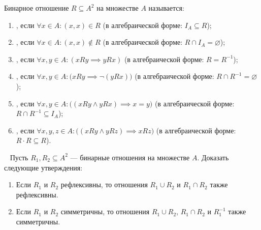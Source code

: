 \begin{definition}
    Бинарное отношение $R \subseteq A^2$ на множестве $A$ называется:
    \begin{enumerate}
        \item {}, если $\forall x \in A : (x, x) \in R$ 
        (в алгебраической форме: $I_A \subseteq R$);
        \item {}, если 
        $\forall x \in A : (x, x) \notin R$ 
        (в алгебраической форме: $R \cap I_A = \varnothing$);
        \item {}, если 
        $\forall x, y \in A : (x R y \implies y R x)$ 
        (в алгебраической форме: $R = R^{-1}$);
        \item {}, если 
        $\forall x, y \in A : \bigl(x R y \implies \neg(y R x)\bigr)$ 
        (в алгебраической форме: $R \cap R^{-1} = \varnothing$);
        \item {}, если 
        $\forall x, y \in A : \bigl((x R y \land y R x) \implies x = y\bigr)$ 
        (в алгебраической форме: $R \cap R^{-1} \subseteq I_A$);
        \item {}, если 
        $\forall x, y, z \in A : \bigl((x R y \land y R z) \implies x R z\bigr)$ 
        (в алгебраической форме: $R \cdot R \subseteq R$).
    \end{enumerate}
\end{definition}

\begin{problem} ~
    Пусть $R_1, R_2 \subseteq A^2$ --- бинарные отношения на множестве $A$. 
    Доказать следующие утверждения:
    \begin{enumerate}
        \item Если $R_1$ и $R_2$ рефлексивны, то отношения $R_1 \cup R_2$ 
        и $R_1 \cap R_2$ также рефлексивны.
        \item Если $R_1$ и $R_2$ симметричны, то отношения $R_1 \cup R_2$, 
        $R_1 \cap R_2$ и $R_1^{-1}$ также симметричны.
    \end{enumerate}
\end{problem}

